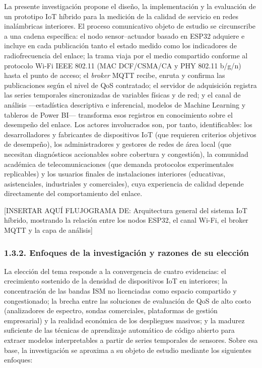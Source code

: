 \documentclass[
  12pt,
]{article}
\begin{document}
La presente investigación propone el diseño, la implementación y la
evaluación de un prototipo IoT híbrido para la medición de la calidad de
servicio en redes inalámbricas interiores. El proceso comunicativo
objeto de estudio se circunscribe a una cadena específica: el nodo
sensor–actuador basado en ESP32 adquiere e incluye en cada publicación
tanto el estado medido como los indicadores de radiofrecuencia del
enlace; la trama viaja por el medio compartido conforme al protocolo
Wi-Fi IEEE 802.11 (MAC DCF/CSMA/CA y PHY 802.11 b/g/n) hasta el punto de
acceso; el \emph{broker} MQTT recibe, enruta y confirma las
publicaciones según el nivel de QoS contratado; el servidor de
adquisición registra las series temporales sincronizadas de variables
físicas y de red; y el canal de análisis —estadística descriptiva e
inferencial, modelos de Machine Learning y tableros de Power BI—
transforma esos registros en conocimiento sobre el desempeño del enlace.
Los actores involucrados son, por tanto, identificables: los
desarrolladores y fabricantes de dispositivos IoT (que requieren
criterios objetivos de desempeño), los administradores y gestores de
redes de área local (que necesitan diagnósticos accionables sobre
cobertura y congestión), la comunidad académica de telecomunicaciones
(que demanda protocolos experimentales replicables) y los usuarios
finales de instalaciones interiores (educativas, asistenciales,
industriales y comerciales), cuya experiencia de calidad depende
directamente del comportamiento del enlace.

{[}INSERTAR AQUÍ FLUJOGRAMA DE: Arquitectura general del sistema IoT
híbrido, mostrando la relación entre los nodos ESP32, el canal Wi-Fi, el
broker MQTT y la capa de análisis{]}

\subsubsection{1.3.2. Enfoques de la investigación y razones de su
elección}\label{enfoques-de-la-investigaciuxf3n-y-razones-de-su-elecciuxf3n}

La elección del tema responde a la convergencia de cuatro evidencias: el
crecimiento sostenido de la densidad de dispositivos IoT en interiores;
la concentración de las bandas ISM no licenciadas como espacio
compartido y congestionado; la brecha entre las soluciones de evaluación
de QoS de alto costo (analizadores de espectro, sondas comerciales,
plataformas de gestión empresarial) y la realidad económica de los
despliegues masivos; y la madurez suficiente de las técnicas de
aprendizaje automático de código abierto para extraer modelos
interpretables a partir de series temporales de sensores. Sobre esa
base, la investigación se aproxima a su objeto de estudio mediante los
siguientes enfoques:
\end{document}
